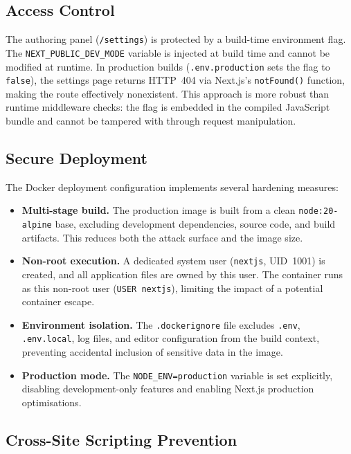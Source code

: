 \subsection{Access Control}\label{subsec:sec-access}

The authoring panel (\texttt{/settings}) is protected by a build-time environment flag. The \texttt{NEXT\_PUBLIC\_DEV\_MODE} variable is injected at build time and cannot be modified at runtime. In production builds (\texttt{.env.production} sets the flag to \texttt{false}), the settings page returns HTTP~404 via Next.js's \texttt{notFound()} function, making the route effectively nonexistent. This approach is more robust than runtime middleware checks: the flag is embedded in the compiled JavaScript bundle and cannot be tampered with through request manipulation.

\subsection{Secure Deployment}\label{subsec:sec-deploy}

The Docker deployment configuration implements several hardening measures:

\begin{itemize}
    \item \textbf{Multi-stage build.} The production image is built from a clean \texttt{node:20-alpine} base, excluding development dependencies, source code, and build artifacts. This reduces both the attack surface and the image size.
    \item \textbf{Non-root execution.} A dedicated system user (\texttt{nextjs}, UID~1001) is created, and all application files are owned by this user. The container runs as this non-root user (\texttt{USER nextjs}), limiting the impact of a potential container escape.
    \item \textbf{Environment isolation.} The \texttt{.dockerignore} file excludes \texttt{.env}, \texttt{.env.local}, log files, and editor configuration from the build context, preventing accidental inclusion of sensitive data in the image.
    \item \textbf{Production mode.} The \texttt{NODE\_ENV=production} variable is set explicitly, disabling development-only features and enabling Next.js production optimisations.
\end{itemize}

\subsection{Cross-Site Scripting Prevention}\label{subsec:sec-xss}

